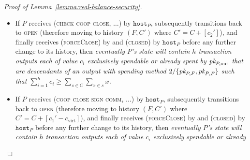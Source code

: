 \begin{proof}[Proof of Lemma~\ref{lemma:real-balance-security}]
\begin{itemize}
    change to its history, then \emph{eventually $P$'s \ledger state will
    contain $h$ transaction outputs each of value $c_i$ exclusively spendable or
    already spent by $\pk{P, \mathrm{out}}$ that are descendants of an output
    with spending method $2/\{\pk{P, F}, \pk{\bar{P}, F}\}$ such that
    $\sum\limits_{i=1}^h c_i \geq \sum\limits_{s \in C} \sum\limits_{x \in s}
    x$}. Furthermore, given that $P$ moves to the \textsc{open} state after the
    (\textsc{virtualising}, $\dots$) message and in case it sends
    (\textsc{funded}, $\dots$) to some party $R$
    (Fig.~\ref{code:ln:virtualise:start-end},
    l.~\ref{code:ln:virtualise:start-end:helper-output-funded}), the latter
    party is the (local, kindred) \texttt{fundee} of a new virtual channel. If
    subsequently the state of $R$ transitions to \textsc{open} (therefore
    obtaining history $(F_R, C_R)$ where $F_R = F + C$ and $C_R = [[0]]$), and
    finally receives (\textsc{forceClose}) by \environment and (\textsc{closed}) by
    $\texttt{host}_R$ ($\texttt{host}_R = \texttt{host}_P$ --
    Fig.~\ref{code:ln:bob}, l.~\ref{code:ln:bob:host}) before any further change
    to its history, then \emph{eventually $R$'s \ledger state will contain an
    output with a $2/\{\pk{R, F}, \pk{\bar{R}, F}\}$ spending method.}
    \item If $P$ receives (\textsc{check coop close}, $\dots$) by
    $\texttt{host}_P$, subsequently transitions back to \textsc{open} (therefore
    moving to history $(F, C')$ where $C' = C + [c_2']$), and finally receives
    (\textsc{forceClose}) by \environment and (\textsc{closed}) by
    $\texttt{host}_P$ before any further change to its history, then
    \emph{eventually $P$'s \ledger state will contain $h$ transaction outputs
    each of value $c_i$ exclusively spendable or already spent by $\pk{P,
    \mathrm{out}}$ that are descendants of an output with spending method
    $2/\{\pk{P, F}, \pk{\bar{P}, F}\}$ such that $\sum\limits_{i=1}^h c_i \geq
    \sum\limits_{s \in C} \sum\limits_{x \in s} x$.}
    \item If $P$ receives (\textsc{coop close sign comm}, $\dots$) by
    $\texttt{host}_P$, subsequently transitions back to \textsc{open} (therefore
    moving to history $(F, C')$ where $C' = C + [c_1' - c_{\mathrm{virt}}]$),
    and finally receives (\textsc{forceClose}) by \environment and
    (\textsc{closed}) by $\texttt{host}_P$ before any further change to its
    history, then \emph{eventually $P$'s \ledger state will contain $h$
    transaction outputs each of value $c_i$ exclusively spendable or already
}
\end{itemize}
\end{proof}
